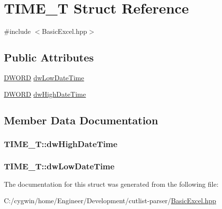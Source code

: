 \hypertarget{struct_t_i_m_e___t}{}\section{T\+I\+M\+E\+\_\+\+T Struct Reference}
\label{struct_t_i_m_e___t}


{\ttfamily \#include $<$Basic\+Excel.\+hpp$>$}

\subsection*{Public Attributes}
\begin{DoxyCompactItemize}
\item 
\hyperlink{_basic_excel_8hpp_a798af1e30bc65f319c1a246cecf59e39}{D\+W\+O\+R\+D} \hyperlink{struct_t_i_m_e___t_a16db38456b2e65d305d7448a9400b815}{dw\+Low\+Date\+Time}
\item 
\hyperlink{_basic_excel_8hpp_a798af1e30bc65f319c1a246cecf59e39}{D\+W\+O\+R\+D} \hyperlink{struct_t_i_m_e___t_a84bb419472d8491b0c13abd151e49d7a}{dw\+High\+Date\+Time}
\end{DoxyCompactItemize}


\subsection{Member Data Documentation}
\hypertarget{struct_t_i_m_e___t_a84bb419472d8491b0c13abd151e49d7a}{}
\subsubsection[{dw\+High\+Date\+Time}]{ T\+I\+M\+E\+\_\+\+T\+::dw\+High\+Date\+Time}\label{struct_t_i_m_e___t_a84bb419472d8491b0c13abd151e49d7a}
\hypertarget{struct_t_i_m_e___t_a16db38456b2e65d305d7448a9400b815}{}
\subsubsection[{dw\+Low\+Date\+Time}]{ T\+I\+M\+E\+\_\+\+T\+::dw\+Low\+Date\+Time}\label{struct_t_i_m_e___t_a16db38456b2e65d305d7448a9400b815}


The documentation for this struct was generated from the following file\+:\begin{DoxyCompactItemize}
\item 
C\+:/cygwin/home/\+Engineer/\+Development/cutlist-\/parser/\hyperlink{_basic_excel_8hpp}{Basic\+Excel.\+hpp}\end{DoxyCompactItemize}
